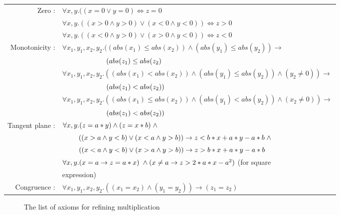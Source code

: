 \vspace*{50px}
\begin{table}[!ht]
\centering
\def\arraystretch{2.5}
\begin{tabular}{rl}
Zero :          & $\forall x, y. ((x = 0 \vee y = 0) \Leftrightarrow z = 0$  \\
               & $\forall x, y. ((x > 0 \wedge y > 0) \vee (x < 0 \wedge y < 0)) \Leftrightarrow z > 0$  \\
               & $\forall x, y. ((x < 0 \wedge y > 0) \vee (x > 0 \wedge y < 0)) \Leftrightarrow z < 0$  \\
Monotonicity :  & $\forall x_{1}, y_{1}, x_{2}, y_{2}. ((abs(x_{1}) \leq abs(x_{2})) \wedge (abs(y_{1}) \leq abs(y_{2})) \to$  \\
                & $\hspace{22mm}(abs(z_1) \leq abs(z_2)$  \\
                & $\forall x_{1}, y_{1}, x_{2}, y_{2}. ((abs(x_{1}) < abs(x_{2})) \wedge (abs(y_{1}) \leq abs(y_{2})) \wedge (y_{2} \neq 0)) \to$  \\
                &  $\hspace{22mm}(abs(z_1) < abs(z_2))$ \\
               & $\forall x_{1}, y_{1}, x_{2}, y_{2}. ((abs(x_{1}) \leq abs(x_{2})) \wedge (abs(y_{1}) < abs(y_{2})) \wedge (x_{2} \neq 0)) \to$ \\
               & $\hspace{22mm}(abs(z_1) < abs(z_2))$ \\
Tangent plane : & $\forall x, y. (z = a \ast y) \wedge (z = x \ast b) \hspace{1mm}\wedge$ \\
               & $\hspace{8mm}((x > a \wedge y < b) \vee (x < a \wedge y > b)) \to z < b \ast x + a \ast y - a \ast b \hspace{1mm}\wedge$ \\
               & $\hspace{8mm}((x < a \wedge y < b) \vee (x > a \wedge y > b)) \to z >  b \ast x + a \ast y - a \ast b$\\
               & $\forall x, y. (x = a \to z = a \ast x) \hspace{1mm}\wedge(x \neq a \to z > 2 \ast a \ast x - a^2)$ (for square\\
               & \hspace{8mm}expression)\\
Congruence : & $\forall x_{1}, y_{1}, x_{2}, y_{2}. ((x_1 = x_2) \wedge (y_1 = y_2)) \to (z_1 = z_2)$
\end{tabular}
\end{table}
\begin{figure}[ht!]
\caption{The list of axioms for refining multiplication}
\label{fig:List_Of_Axioms_For_Refining_Multiplication}
\end{figure}\newpage

